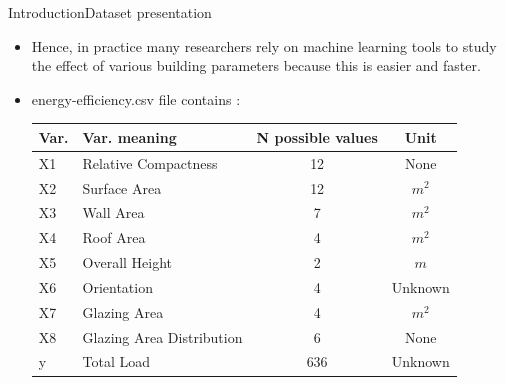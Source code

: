 \documentclass[10pt]{beamer}
\begin{document}
\begin{frame}{Introduction}{Dataset presentation}
\begin{itemize}
  \item Hence, in practice many researchers rely on machine learning tools
      to study the effect of various building parameters because this is
        easier and faster.

  \item energy-efficiency.csv file contains :\\\medskip
    \begin{tabular}{llcc}
      \hline
      Var. & Var. meaning & N possible values & Unit \\
      \hline
      X1 & Relative Compactness & 12 & None \\
      X2 & Surface Area & 12 & $m^2$\\
      X3 & Wall Area & 7 & $m^2$\\
      X4 & Roof Area & 4 & $m^2$\\
      X5 & Overall Height & 2 & $m$\\
      X6 & Orientation & 4 & Unknown\\
      X7 & Glazing Area & 4 & $m^2$\\
      X8 & Glazing Area Distribution & 6 & None \\
      y & Total Load & 636 & Unknown \\
    \end{tabular}
\end{itemize}
\end{frame}

\end{document}
